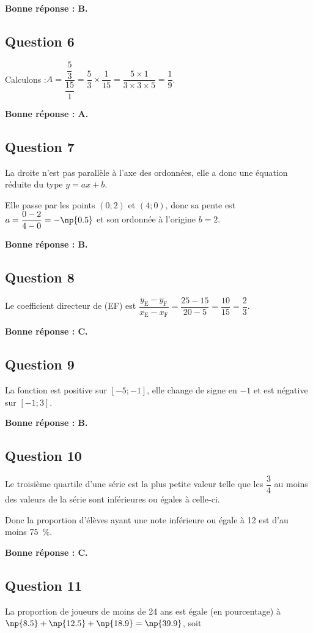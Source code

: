 	\textbf{Bonne réponse : B.}

\subsection*{Question 6}
	Calculons :\quad \mbox{$A = \dfrac{\dfrac53}{\dfrac{15}{1}} = \dfrac53\times\dfrac{1}{15} = \dfrac{5\times1}{3\times3\times5} = \dfrac19$}.

	\textbf{Bonne réponse : A.}

\subsection*{Question 7}
	La droite n'est pas parallèle à l'axe des ordonnées, elle a donc une équation réduite du type \mbox{$y = ax + b$}.

	Elle passe par les points \mbox{$(0;2)$} et \mbox{$(4;0)$}, donc sa pente est \mbox{$a = \dfrac{0-2}{4-0} = -\np{0.5}$} et son ordonnée à l'origine \mbox{$b = 2$}.

	\textbf{Bonne réponse : B.}

\subsection*{Question 8}
	Le coefficient directeur de (EF) est \mbox{$\dfrac{y_\text{E}-y_\text{F}}{x_\text{E}-x_\text{F}} = \dfrac{25-15}{20-5} = \dfrac{10}{15} = \dfrac23$}.

	\textbf{Bonne réponse : C.}

\subsection*{Question 9}
	La fonction est positive sur \mbox{$[-5;-1]$}, elle change de signe en $-1$ et est négative sur \mbox{$[-1;3]$}.

	\textbf{Bonne réponse : B.}

\subsection*{Question 10}
	Le troisième quartile d'une série est la plus petite valeur telle que les \mbox{$\dfrac34$} au moins des valeurs de la série sont inférieures ou égales à celle-ci.

	Donc la proportion d'élèves ayant une note inférieure ou égale à 12 est d'au moins 75~\%.

	\textbf{Bonne réponse : C.}

\subsection*{Question 11}
	La proportion de joueurs de moins de 24 ans est égale (en pourcentage) à \mbox{$\np{8.5}+\np{12.5}+\np{18.9} = \np{39.9}$}, soit 

